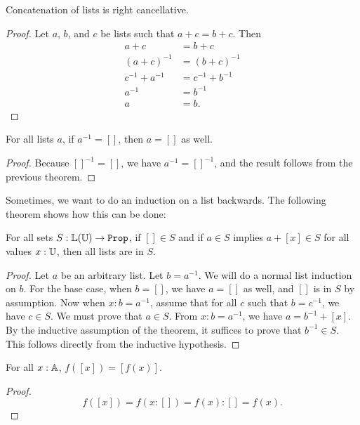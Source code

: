 \documentclass[../../math.tex]{subfiles}
\begin{document}
\begin{instance}
    Concatenation of lists is right cancellative.
\end{instance}
\begin{proof}
    Let $a$, $b$, and $c$ be lists such that $a + c = b + c$.  Then
    \begin{align*}
        a + c &= b + c \\
        (a + c)^{-1} &= (b + c)^{-1} \\
        c^{-1} + a^{-1} &= c^{-1} + b^{-1} \\
        a^{-1} &= b^{-1} \\
        a &= b.
    \end{align*}
\end{proof}

\begin{theorem}
    For all lists $a$, if $a^{-1} = []$, then $a = []$ as well.
\end{theorem}
\begin{proof}
    Because $[]^{-1} = []$, we have $a^{-1} = []^{-1}$, and the result follows
    from the previous theorem.
\end{proof}

Sometimes, we want to do an induction on a list backwards.  The following
theorem shows how this can be done:

\begin{theorem} \label{list_backwards_induction}
    For all sets $S : \L(\U) \to \Prop$, if $[] \in S$ and if $a \in S$ implies
    $a + [x] \in S$ for all values $x : \mathbb{U}$, then all lists are in $S$.
\end{theorem}
\begin{proof}
    Let $a$ be an arbitrary list.  Let $b = a^{-1}$.  We will do a normal list
    induction on $b$.  For the base case, when $b = []$, we have $a = []$ as
    well, and $[]$ is in $S$ by assumption.  Now when $x : b = a^{-1}$, assume
    that for all $c$ such that $b = c^{-1}$, we have $c \in S$.  We must prove
    that $a \in S$.  From $x : b = a^{-1}$, we have $a = b^{-1} + [x]$.  By the
    inductive assumption of the theorem, it suffices to prove that $b^{-1} \in
    S$.  This follows directly from the inductive hypothesis.
\end{proof}

\begin{theorem}
    For all $x : \mathbb{A}$, $f([x]) = [f(x)]$.
\end{theorem}
\begin{proof}
    \[
        f([x]) = f(x : []) = f(x) : [] = f(x).
    \]
\end{proof}
\end{document}
